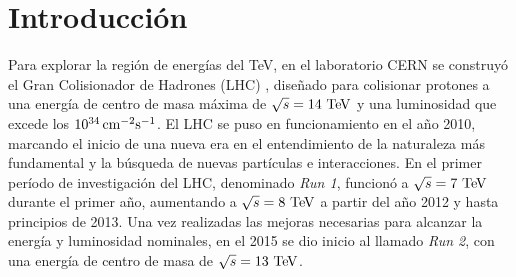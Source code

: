 \chapter*{Introducción}

Para explorar la región de energías del TeV, en el laboratorio CERN se construyó
el Gran Colisionador de Hadrones (LHC) \cite{Evans:1129806}, diseñado para
colisionar protones a una energía de centro de masa máxima de $\sqrt{s} = 14
\tev$ y una luminosidad que excede los $\unit[10^{34}]{cm^{-2}s^{-1}}$. El LHC
se puso en funcionamiento en el a\~no 2010, marcando el inicio de una nueva era
en el entendimiento de la naturaleza más fundamental y la búsqueda de nuevas
partículas e interacciones. En el primer período de investigación del LHC,
denominado \emph{Run 1}, funcionó a $\sqrt{s}=7\tev$ durante el primer a\~no,
aumentando a $\sqrt{s}=8\tev$ a partir del a\~no 2012 y hasta principios de
2013. Una vez realizadas las mejoras necesarias para alcanzar la energía y
luminosidad nominales, en el 2015 se dio inicio al llamado \emph{Run 2}, con una
energía de centro de masa de $\sqrt{s} = 13 \tev$.

